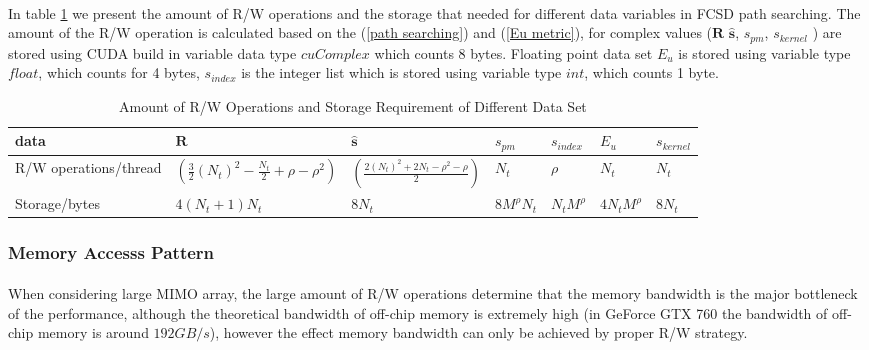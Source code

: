 \documentclass[12pt,a4paper,final]{article}
\begin{document}
\begin{spacing}{2.5}
 \paragraph{}In table \ref{amount of R/W operation} we present the amount of R/W operations and the storage that needed for different data variables in FCSD path searching. The amount of the R/W operation is calculated based on the (\ref{path searching}) and (\ref{Eu metric}), for complex values ($\mathbf{R}$ $\mathbf{\hat{s}}$, $\mathit{s_{pm}}$, $\mathit{s_{kernel}}$ ) are stored using CUDA build in variable data type $\mathit{cuComplex}$ which counts 8 bytes. Floating point data set $E_{u}$ is stored using variable type $\mathit{float}$, which counts for 4 bytes, $\mathit{s_{index}}$ is the integer list which is stored using variable type $\mathit{int}$, which counts 1 byte.\\
 \begin{table}[htb]  
 \renewcommand{\arraystretch}{1.3}
 \centering

\begin{tabular}{|p{3cm}|p{3cm}|l|p{3cm}|l|l|l|}
\hline
data & $\mathbf{R}$ & $\mathbf{\hat{s}}$ & $\mathit{s_{pm}}$ & $\mathit{s_{index}}$ & $\mathit{E_{u}}$ & $\mathit{s_{kernel}}$ \\
\hline
R/W operations/thread & $(\frac{3}{2}(N_{t})^{2}-\frac{N_{t}}{2}+\rho-\rho^{2})$ & $(\frac{2(N_{t})^{2}+2N_{t}-\rho^{2}-\rho}{2})$ & $N_{t}$ & $\rho$ &$N_{t}$ & $N_{t}$ \\
\hline
Storage/bytes  & $4(N_{t}+1)N_{t}$ & $8N_{t}$ & $8M^{\rho}N_{t}$ & $N_{t}M^{\rho}$ & $4N_{t}M^{\rho}$ & $8N_{t}$\\
\hline  

\end{tabular} 
 \label{amount of R/W operation} 
 \caption{Amount of R/W Operations and Storage Requirement of Different Data Set}
\end{table} 
\subsubsection{Memory Accesss Pattern}
  \paragraph{}When considering large MIMO array, the large amount of R/W operations determine that the memory bandwidth is the major bottleneck of the performance,  although the theoretical bandwidth of off-chip memory is extremely high (in GeForce GTX 760 the bandwidth of off-chip memory is around $192 GB/s$), however the effect memory bandwidth can only be achieved by proper R/W strategy.\\

\end{spacing}
\end{document}
